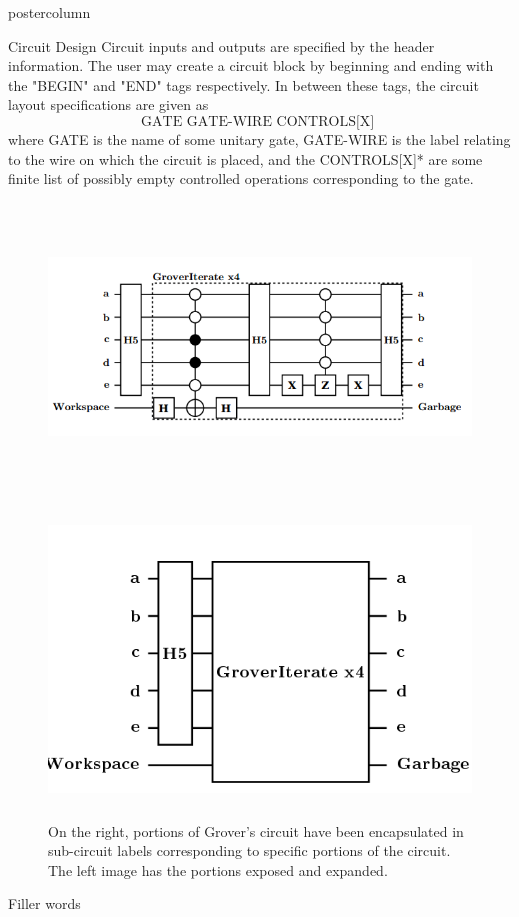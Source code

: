 \documentclass[final]{beamer} %
\begin{document}
\begin{frame}{}
\begin{columns}
\begin{column}{.33\textwidth}
\begin{beamercolorbox}[center,wd=\textwidth]{postercolumn}
\begin{minipage}[c][0.95\textheight][s]{0.95\columnwidth}
\begin{block}{\large Circuit Design}
                Circuit inputs and outputs are specified by the header information. 
                The user may create a circuit block by beginning and ending with the "BEGIN" and "END" tags respectively. 
                In between these tags, the circuit layout specifications are given as
                \[ \text{GATE \ GATE-WIRE \ CONTROLS[X] } \]
                where GATE is the name of some unitary gate, GATE-WIRE is the label relating to the wire on which the circuit is placed, and the CONTROLS[X]* are some finite list of possibly empty controlled operations corresponding to the gate.
                \begin{figure}[!htbp]
		            \centering
		            \includegraphics[height=3in]{figures/Grover_Loop.png} \ \ \ \ \includegraphics[height=3in]{figures/Grover_Roll.png} 
		            \caption{On the right, portions of Grover's circuit have been encapsulated in sub-circuit labels corresponding to specific portions of the circuit. The left image has the portions exposed and expanded.}
		        \end{figure}
	    Filler words
		        \begin{figure}[!htbp]

\end{figure}
\end{block}
\end{minipage}
\end{beamercolorbox}
\end{column}
\end{columns}
\end{frame}
\end{document}
